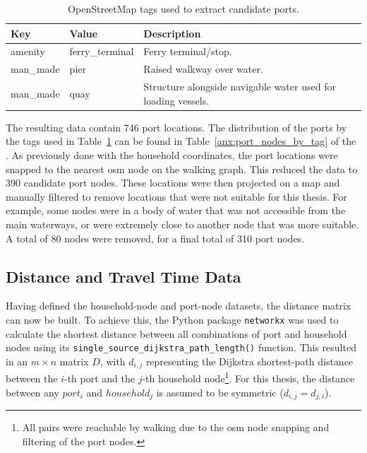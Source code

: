 \documentclass[12pt]{article}
\begin{document}
\begin{table}[htbp]
  \centering
  \caption{OpenStreetMap tags used to extract candidate ports.}
  \label{tab:osm_port_tags}

  \begin{tabular}{l l p{8.5cm}}
    \toprule
    \textbf{Key} & \textbf{Value}  & \textbf{Description}                                          \\
    \midrule
    amenity      & ferry\_terminal & Ferry terminal/stop.                                          \\
    man\_made    & pier            & Raised walkway over water.                                    \\
    man\_made    & quay            & Structure alongside navigable water used for loading vessels. \\
    \bottomrule
  \end{tabular}
\end{table}

The resulting data contain \num{746} port locations. The distribution of the ports by the tags used in Table~\ref{tab:osm_port_tags} can be found in Table~\ref{anx:port_nodes_by_tag} of the . As previously done with the household coordinates, the port locations were snapped to the nearest \ac{osm} node on the walking graph. This reduced the data to \num{390} candidate port nodes. These locations were then projected on a map and manually filtered to remove locations that were not suitable for this thesis. For example, some nodes were in a body of water that was not accessible from the main waterways, or were extremely close to another node that was more suitable. A total of \num{80} nodes were removed, for a final total of \num{310} port nodes.

\subsection{Distance and Travel Time Data}
\label{subsec:distance-travel-time-data}

Having defined the household-node and port-node datasets, the distance matrix can now be built. To achieve this, the Python package \texttt{networkx} \parencite{networkx} was used to calculate the shortest distance between all combinations of port and household nodes using its \texttt{single\_source\_dijkstra\_path\_length()} function. This resulted in an \(m \times n\) matrix \(D\), with \(d_{i,j}\) representing the Dijkstra shortest-path distance between the \(i\)-th port and the \(j\)-th household node\footnote{All pairs were reachable by walking due to the \ac{osm} node snapping and filtering of the port nodes.}. For this thesis, the distance between any \(port_i\) and \(household_j\) is assumed to be symmetric (\(d_{i,j} = d_{j,i}\)).
\end{document}
